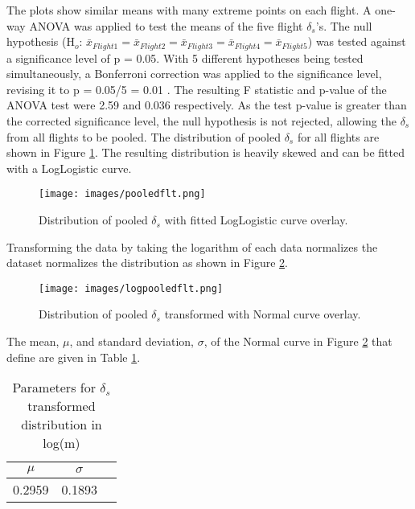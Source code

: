 \documentclass[preprint,12pt,a4paper]{elsarticle}
\begin{document}
\begin{linenumbers}
The plots show similar means with many extreme points on each flight. A one-way ANOVA was applied to test the means of the five flight $\delta_{s}$'s. The null hypothesis (H$_{o}$: $\bar{x}_{Flight 1} = \bar{x}_{Flight 2}= \bar{x}_{Flight 3}= \bar{x}_{Flight 4}= \bar{x}_{Flight 5}$) was tested against a significance level of p = 0.05. With 5 different hypotheses being tested simultaneously, a Bonferroni correction was applied to the significance level, revising it to  p = 0.05/5 = 0.01 \citep{Rasch2011}.  The resulting F statistic and p-value of the ANOVA test were 2.59 and 0.036 respectively. As the test p-value is greater than the corrected significance level, the null hypothesis is not rejected, allowing the $\delta_{s}$ from all flights to be pooled.  The distribution of pooled  $\delta_{s}$ for all flights are shown in Figure \ref{fig:pooledflt}. The resulting distribution is heavily skewed and can be fitted with a LogLogistic curve. 

\begin{figure}[H]
\centering
\texttt{[image: images/pooledflt.png]} 
\caption{Distribution of pooled $\delta_{s}$ with fitted LogLogistic curve overlay.}
\label{fig:pooledflt}
\end{figure}

Transforming the data by taking the logarithm of each data normalizes the dataset normalizes the distribution as shown in Figure \ref{fig:logpooledflt}.

\begin{figure}[H]
\centering
\texttt{[image: images/logpooledflt.png]} 
\caption{Distribution of pooled $\delta_{s}$ transformed with Normal curve overlay.}
\label{fig:logpooledflt}
\end{figure}


The mean, $\mu$, and standard deviation, $\sigma$, of  the Normal curve in Figure  \ref{fig:logpooledflt} that define are given in Table \ref{tab:gapnormal}.

\begin{table}[H]
\centering
\caption{Parameters for $\delta_{s}$ transformed distribution in log(m)}
\label{tab:gapnormal}
\begin{tabular}{@{}ccc@{}}
\toprule
 \textbf{$\mu$} & \textbf{$\sigma$} \\ \midrule
 0.2959 & 0.1893 \\ \bottomrule
\end{tabular}
\end{table}


\end{linenumbers}
\end{document}
